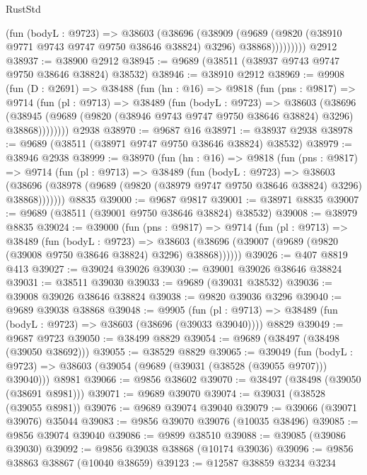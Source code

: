 \begin{lexlean}{RustStd}
\begin{coremodule}
              (fun (bodyL : @9723) =>
              @38603
                (@38696
                  (@38909
                    (@9689
                      (@9820 (@38910 @9771 @9743 @9747 @9750 @38646 @38824) @3296)
                      @38868)))))))))
    @2912
@38937 := @38900 @2912
@38945 := @9689 (@38511 (@38937 @9743 @9747 @9750 @38646 @38824) @38532)
@38946 := @38910 @2912
@38969 := @9908
    (fun (D : @2691) =>
    @38488
      (fun (hn : @16) =>
      @9818
        (fun (pns : @9817) =>
        @9714
          (fun (pl : @9713) =>
          @38489
            (fun (bodyL : @9723) =>
            @38603
              (@38696
                (@38945 (@9689 (@9820 (@38946 @9743 @9747 @9750 @38646 @38824) @3296) @38868))))))))
    @2938
@38970 := @9687 @16
@38971 := @38937 @2938
@38978 := @9689 (@38511 (@38971 @9747 @9750 @38646 @38824) @38532)
@38979 := @38946 @2938
@38999 := @38970
    (fun (hn : @16) =>
    @9818
      (fun (pns : @9817) =>
      @9714
        (fun (pl : @9713) =>
        @38489
          (fun (bodyL : @9723) =>
          @38603
            (@38696 (@38978 (@9689 (@9820 (@38979 @9747 @9750 @38646 @38824) @3296) @38868)))))))
    @8835
@39000 := @9687 @9817
@39001 := @38971 @8835
@39007 := @9689 (@38511 (@39001 @9750 @38646 @38824) @38532)
@39008 := @38979 @8835
@39024 := @39000
    (fun (pns : @9817) =>
    @9714
      (fun (pl : @9713) =>
      @38489
        (fun (bodyL : @9723) =>
        @38603 (@38696 (@39007 (@9689 (@9820 (@39008 @9750 @38646 @38824) @3296) @38868))))))
@39026 := @407 @8819 @413
@39027 := @39024 @39026
@39030 := @39001 @39026 @38646 @38824
@39031 := @38511 @39030
@39033 := @9689 (@39031 @38532)
@39036 := @39008 @39026 @38646 @38824
@39038 := @9820 @39036 @3296
@39040 := @9689 @39038 @38868
@39048 := @9905
    (fun (pl : @9713) => @38489 (fun (bodyL : @9723) => @38603 (@38696 (@39033 @39040))))
    @8829
@39049 := @9687 @9723
@39050 := @38499 @8829
@39054 := @9689 (@38497 (@38498 (@39050 @38692)))
@39055 := @38529 @8829
@39065 := @39049
    (fun (bodyL : @9723) => @38603 (@39054 (@9689 (@39031 (@38528 (@39055 @9707))) @39040)))
    @8981
@39066 := @9856 @38602
@39070 := @38497 (@38498 (@39050 (@38691 @8981)))
@39071 := @9689 @39070
@39074 := @39031 (@38528 (@39055 @8981))
@39076 := @9689 @39074 @39040
@39079 := @39066 (@39071 @39076) @35044
@39083 := @9856 @39070 @39076 (@10035 @38496)
@39085 := @9856 @39074 @39040
@39086 := @9899 @38510
@39088 := @39085 (@39086 @39030)
@39092 := @9856 @39038 @38868 (@10174 @39036)
@39096 := @9856 @38863 @38867 (@10040 @38659)
@39123 := @12587
    @38859
    @3234
    @3234

\end{coremodule}
\end{lexlean}

